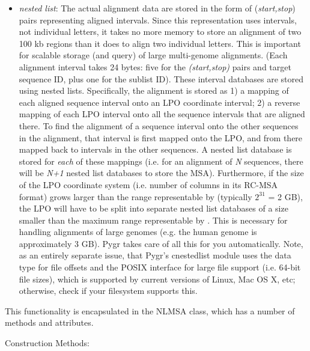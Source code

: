 \documentclass{howto}
\begin{document}
\begin{itemize}
\item
{\em nested list}: The actual alignment data are stored in the form of
({\em start,stop}) pairs representing aligned intervals.  Since this representation
uses intervals, not individual letters, it takes no more memory to store
an alignment of two 100 kb regions than it does to align two individual letters.
This is important for scalable storage (and query) of large multi-genome
alignments.  (Each alignment interval takes 24 bytes: five  for
the {\em (start,stop)} pairs and target sequence ID, plus one 
for the sublist ID).
These interval databases are stored using nested lists.  Specifically, 
the alignment is stored as 1) a mapping of each aligned sequence interval
onto an LPO coordinate interval; 2) a reverse mapping of each LPO interval onto
all the sequence intervals that are aligned there.  To find the alignment of
a sequence interval onto the other sequences in the alignment, that interval
is first mapped onto the LPO, and from there mapped back to intervals in the
other sequences.  A nested list database is stored for {\em each} of these 
mappings (i.e. for an alignment of {\em N} sequences, there will be {\em N+1}
nested list databases to store the MSA).  Furthermore, if the size of the LPO
coordinate system (i.e. number of columns in its RC-MSA format)
grows larger than the range representable by  (typically $2^{31}$  = 2 GB),
the LPO will have to be split into separate nested list databases of a size
smaller than the maximum range representable by .  This is necessary
for handling alignments of large genomes (e.g. the human genome is approximately 3 GB).
Pygr takes care of all this for you automatically.  Note, as an entirely separate 
issue, that Pygr's cnestedlist
module uses the  data type for file offsets and
the  POSIX interface for large file support (i.e. 64-bit
file sizes), which is supported by current versions of Linux, Mac OS X, etc;
otherwise, check if your filesystem supports this.

\end{itemize}

This functionality is encapsulated in the NLMSA class, which has a number of methods
and attributes.

Construction Methods:
\end{document}

